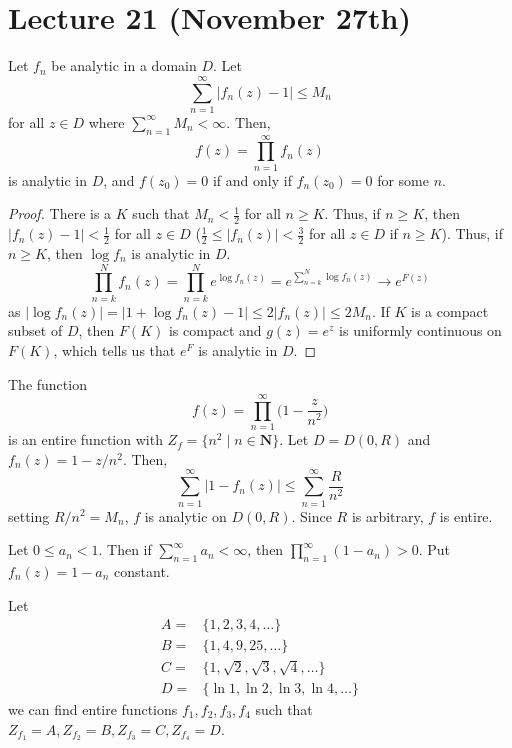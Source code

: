\section{Lecture 21 (November 27th)}
\begin{recall}
Let $f_{n}$ be analytic in a domain $D$. Let
\[\sum ^{\infty }_{n=1}|f_{n}(z)-1|\leq M_{n}\]
for all $z\in D$ where $\sum ^{\infty }_{n=1}M_{n}<\infty $. Then,
\[f(z)=\prod^{\infty }_{n=1}f_{n}(z)\]
is analytic in $D$, and $f(z_0)=0$ if and only if $f_{n}(z_0)=0$ for some $n$. 
\end{recall}
\vspace{2ex}
\begin{proof}
There is a $K$ such that $M_{n}<\frac{1}{2}$ for all $n\geq K$. Thus, if $n\geq K$, then $|f_{n}(z)-1|<\frac{1}{2}$ for all $z\in D$ ($\frac{1}{2}\leq |f_{n}(z)|<\frac{3}{2}$ for all $z\in D$ if $n\geq K$). Thus, if $n\geq K$, then $\log f_{n}$ is analytic in $D$.
\[\prod^{N}_{n=k}f_{n}(z)=\prod^{N}_{n=k}e^{\log f_{n}(z)}=e^{\sum ^{N}_{n=k}\log f_{n}(z)}\rightarrow e^{F(z)}\]
as $|\log f_{n}(z)|=|1+\log f_{n}(z)-1|\leq 2|f_{n}(z)|\leq 2M_{n}$. If $K$ is a compact subset of $D$, then $F(K)$ is compact and $g(z)=e^{z}$ is uniformly continuous on $F(K)$, which tells us that $e^{F}$ is analytic in $D$.
\end{proof}
\vspace{2ex}
\begin{ex}
The function
\[f(z)=\prod^{\infty }_{n=1}\Big(1-\dfrac{z}{n^2}\Big)\]
is an entire function with $Z_{f}=\{n^2\;|\;n\in {\bm N}\}$. Let $D=D(0,R)$ and $f_{n}(z)=1-z/n^2$. Then,
\[\sum ^{\infty }_{n=1}|1-f_{n}(z)|\leq \sum ^{\infty }_{n=1}\dfrac{R}{n^2}\]
setting $R/n^2=M_{n}$, $f$ is analytic on $D(0,R)$. Since $R$ is arbitrary, $f$ is entire. 
\end{ex}
\vspace{2ex}
\begin{ex}
Let $0\leq a_{n}<1$. Then if $\sum ^{\infty }_{n=1}a_{n}<\infty $, then $\prod^{\infty }_{n=1}(1-a_{n})>0$. Put $f_{n}(z)=1-a_{n}$ constant.
\end{ex}
\vspace{2ex}
\begin{prop}
Let
\[\begin{align*}
A=&\{1,2,3,4,\ldots \}\\
B=&\{1,4,9,25,\ldots \}\\
C=&\{1,\sqrt{2},\sqrt{3},\sqrt{4},\ldots \}\\
D=&\{\ln 1,\ln 2,\ln 3,\ln 4,\ldots  \}
\end{align*}\]
we can find entire functions $f_1,f_2,f_3,f_4$ such that $Z_{f_1}=A,Z_{f_2}=B,Z_{f_3}=C,Z_{f_4}=D$. 
\end{prop}
